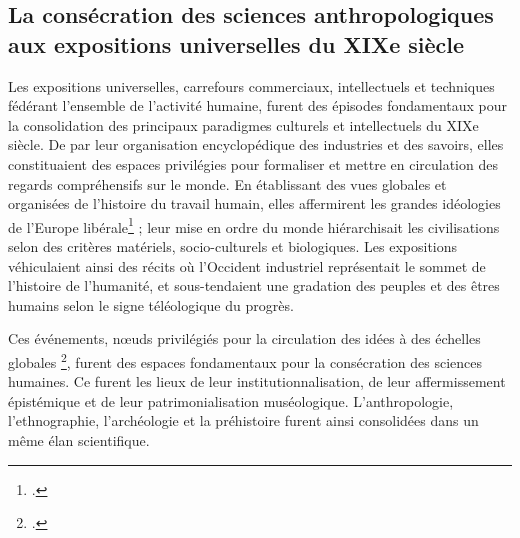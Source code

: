 \documentclass{article}
\begin{document}
	\subsection{La consécration des sciences anthropologiques aux expositions universelles du XIXe siècle}
	
	Les expositions universelles, carrefours commerciaux, intellectuels et techniques fédérant l’ensemble de l’activité humaine, furent des épisodes fondamentaux pour la consolidation des principaux paradigmes culturels et intellectuels du XIXe siècle. De par leur organisation encyclopédique des industries et des savoirs, elles constituaient des espaces privilégies pour formaliser et mettre en circulation des regards compréhensifs sur le monde. En établissant des vues globales et organisées de l’histoire du travail humain, elles affermirent les grandes idéologies de l’Europe libérale\footcite{benjaminParisCapitaleXIXe2003} ; leur mise en ordre du monde hiérarchisait les civilisations selon des critères matériels, socio-culturels et biologiques. Les expositions véhiculaient ainsi des récits où l’Occident industriel représentait le sommet de l’histoire de l’humanité, et sous-tendaient une gradation des peuples et des êtres humains selon le signe téléologique du progrès.
	
	Ces événements, nœuds privilégiés pour la circulation des idées à des échelles globales \footcite{schusterWorldFairsSpaces2018}, furent des espaces fondamentaux pour la consécration des sciences humaines. Ce furent les lieux de leur institutionnalisation, de leur affermissement épistémique et de leur patrimonialisation muséologique. L’anthropologie, l’ethnographie, l’archéologie et la préhistoire furent ainsi consolidées dans un même élan scientifique.
	
\end{document}
